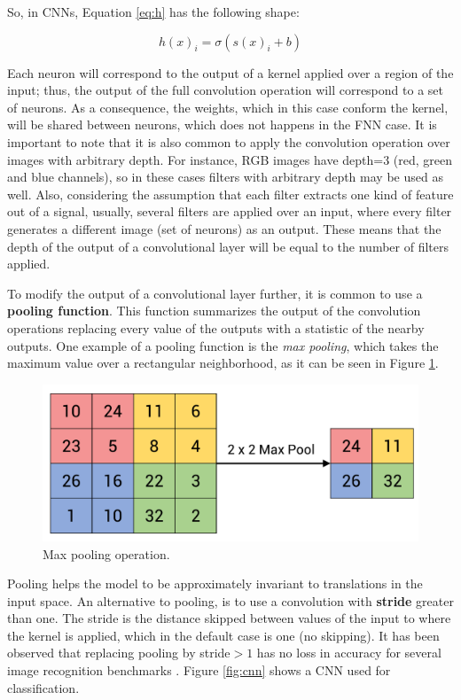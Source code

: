 So, in CNNs, Equation \ref{eq:h} has the following shape:

\begin{equation}
    h(x)_{i} = \sigma(s(x)_{i} + b)
    \label{eq:h2}
\end{equation}

Each neuron will correspond to the output of a kernel applied over a region of the input; thus, the output of the full convolution operation will correspond to a set of neurons. As a consequence, the weights, which in this case conform the kernel, will be shared between neurons, which does not happens in the FNN case. It is important to note that it is also common to apply the convolution operation over images with arbitrary depth. For instance, RGB images have depth=3 (red, green and blue channels), so in these cases filters with arbitrary depth may be used as well. Also, considering the assumption that each filter extracts one kind of feature out of a signal, usually, several filters are applied over an input, where every filter generates a different image (set of neurons) as an output. These means that the depth of the output of a convolutional layer will be equal to the number of filters applied.

To modify the output of a convolutional layer further, it is common to use a \textbf{pooling function}. This function summarizes the output of the convolution operations replacing every value of the outputs with a statistic of the nearby outputs. One example of a pooling function is the \emph{max pooling}, which takes the maximum value over a rectangular neighborhood, as it can be seen in Figure \ref{fig:maxpool}. 

\begin{figure}[H]
    \centering
    \includegraphics[width=0.5\linewidth]{imagenes/cap1/max_pool.pdf}
    \caption{Max pooling operation.}
    \label{fig:maxpool}
\end{figure}

Pooling helps the model to be approximately invariant to translations in the input space. An alternative to pooling, is to use a convolution with \textbf{stride} greater than one. The stride is the distance skipped between values of the input to where the kernel is applied, which in the default case is one (no skipping). It has been observed that replacing pooling by stride$>1$ has no loss in accuracy for several image recognition benchmarks \cite{springenberg2014striving}. Figure \ref{fig:cnn} shows a CNN used for classification.
    

